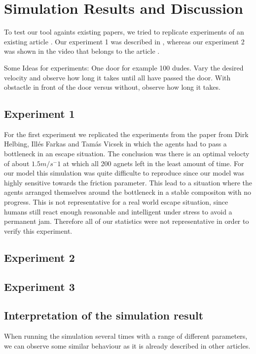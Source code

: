 \documentclass[11pt]{article}
\begin{document}
\section{Simulation Results and Discussion}
To test our tool againts existing papers, we tried to replicate experiments of an existing article \cite{Helbing}. Our experiment 1 was described in \cite{Helbing}, whereas our experiment 2 was shown in the video that belongs to the article \cite{Helbing}.  

Some Ideas for experiments: One door for example 100 dudes. Vary the desired velocity and observe how long it takes until all have passed the door.
With obstactle in front of the door versus without, observe how long it takes.


\subsection{Experiment 1}

For the first experiment we replicated the experiments from the paper \cite{Simulating dynamical features of escape panic} from Dirk Helbing, Illés Farkas and Tamás Vicsek in which the agents had to pass a bottleneck in an escape situation. The conclusion was there is an optimal velocty of about $1.5 m/s^-1$ at which all 200 agnets left in the least amount of time. For our model this simulation was quite difficulte to reproduce since our model was highly sensitive towards the friction parameter. This lead to a situation where the agents arranged themselves around the bottleneck in a stable compositon with no progress. This is not representative for a real world escape situation, since humans still react enough reasonable and intelligent under stress to avoid a permanent jam. Therefore all of our statistics were not representative in order to verify this experiment.  

\subsection{Experiment 2}

\subsection{Experiment 3}

\subsection{Interpretation of the simulation result}
When running the simulation several times with a range of different parameters, we can observe some similar behaviour as it is already described in other articles.
\end{document}
